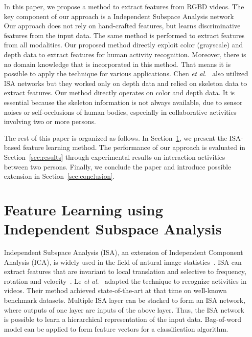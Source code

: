 \documentclass{article}
\begin{document}
In this paper, we propose a method to extract features from RGBD videos.
The key component of our approach is a Independent Subspace Analysis network~\cite{2011_Le_ISA}  
Our approach does not rely on hand-crafted features, but learns discriminative features from the input data.
The same method is performed to extract features from all modalities.
Our proposed method directly exploit color (grayscale) and depth data to extract features for human activity recognition.
Moreover, there is no domain knowledge that is incorporated in this method.
That means it is possible to apply the technique for various applications.
Chen \textit{et al.}~\cite{2014_Chen_ISACombination} also utilized ISA networks but they worked only on depth data and relied on skeleton data to extract features.
Our method directly operates on color and depth data.
It is essential because the skeleton information is not always available, due to sensor noises or self-occlusions of human bodies, especially in collaborative activities involving two or more persons.

The rest of this paper is organized as follows.
In Section~\ref{sec:single}, we present the ISA-based feature learning method.
The performance of our approach is evaluated in Section~\ref{sec:results} through experimental results on interaction activities between two persons.
Finally, we conclude the paper and introduce possible extension in Section~\ref{sec:conclusion}.

\section{Feature Learning using Independent Subspace Analysis}
\label{sec:single}

Independent Subspace Analysis (ISA), an extension of Independent Component Analysis (ICA), is widely-used in the field of natural image statistics~\cite{2009_Hyvrinen_NaturalImgStat}.
ISA can extract features that are invariant to local translation and selective to frequency, rotation and velocity~\cite{2011_Le_ISA}.
Le \textit{et al.}~\cite{2011_Le_ISA} adapted the technique to recognize activities in videos.
Their method achieved state-of-the-art at that time on well-known benchmark datasets. 
Multiple ISA layer can be stacked to form an ISA network, where outputs of one layer are inputs of the above layer.
Thus, the ISA network is possible to learn a hierarchical representation of the input data.
Bag-of-word model can be applied to form feature vectors for a classification algorithm.
\end{document}
